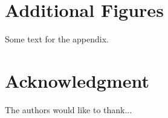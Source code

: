 \documentclass[journal]{IEEEtran}
\begin{document}



%


\appendices
\section{Additional Figures}
Some text for the appendix.

\section*{Acknowledgment}


The authors would like to thank...


\ifCLASSOPTIONcaptionsoff
  \newpage
\fi




\end{document}
